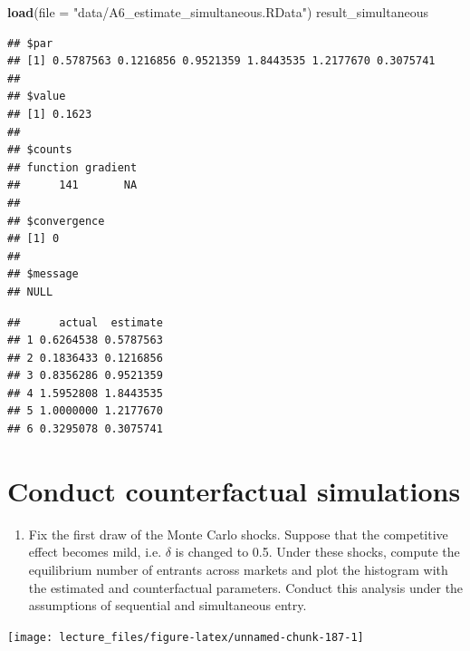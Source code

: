 \documentclass[]{book}
\newenvironment{Shaded}{\begin{snugshade}}{\end{snugshade}}
\newcommand{\KeywordTok}[1]{\textcolor[rgb]{0.13,0.29,0.53}{\textbf{#1}}}
\newcommand{\DataTypeTok}[1]{\textcolor[rgb]{0.13,0.29,0.53}{#1}}
\newcommand{\StringTok}[1]{\textcolor[rgb]{0.31,0.60,0.02}{#1}}
\newcommand{\OperatorTok}[1]{\textcolor[rgb]{0.81,0.36,0.00}{\textbf{#1}}}
\newcommand{\NormalTok}[1]{#1}
\providecommand{\tightlist}{%
  \setlength{\itemsep}{0pt}\setlength{\parskip}{0pt}}
\begin{document}
\begin{Shaded}
\begin{Highlighting}[]
\KeywordTok{load}\NormalTok{(}\DataTypeTok{file =} \StringTok{"data/A6_estimate_simultaneous.RData"}\NormalTok{)}
\NormalTok{result_simultaneous}
\end{Highlighting}
\end{Shaded}

\begin{verbatim}
## $par
## [1] 0.5787563 0.1216856 0.9521359 1.8443535 1.2177670 0.3075741
## 
## $value
## [1] 0.1623
## 
## $counts
## function gradient 
##      141       NA 
## 
## $convergence
## [1] 0
## 
## $message
## NULL
\end{verbatim}

\begin{Shaded}
\end{Shaded}

\begin{verbatim}
##      actual  estimate
## 1 0.6264538 0.5787563
## 2 0.1836433 0.1216856
## 3 0.8356286 0.9521359
## 4 1.5952808 1.8443535
## 5 1.0000000 1.2177670
## 6 0.3295078 0.3075741
\end{verbatim}

\section{Conduct counterfactual
simulations}\label{conduct-counterfactual-simulations}

\begin{enumerate}
\def\labelenumi{\arabic{enumi}.}
\tightlist
\item
  Fix the first draw of the Monte Carlo shocks. Suppose that the
  competitive effect becomes mild, i.e. \(\delta\) is changed to 0.5.
  Under these shocks, compute the equilibrium number of entrants across
  markets and plot the histogram with the estimated and counterfactual
  parameters. Conduct this analysis under the assumptions of sequential
  and simultaneous entry.
\end{enumerate}

\begin{center}\texttt{[image: lecture\_files/figure-latex/unnamed-chunk-187-1]} \end{center}
\end{document}
